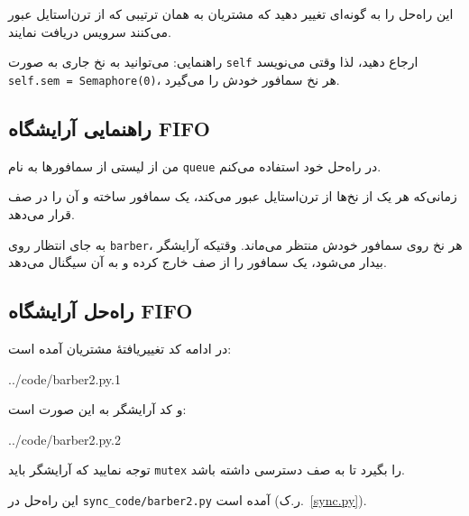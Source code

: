 \documentclass{book}
\newcommand{\clearemptydoublepage}{\newpage\cleardoublepage}
\begin{document}
	این راه‌حل را به گونه‌ای تغییر دهید که مشتریان به همان ترتیبی که از ترن‌استایل عبور می‌کنند سرویس دریافت نمایند.
  
	راهنمایی: می‌توانید به نخ جاری به صورت {\tt self} ارجاع دهید، 
	لذا وقتی می‌نویسد {\tt self.sem = Semaphore(0)}، هر نخ سمافور خودش را می‌گیرد.


\clearemptydoublepage
\subsection{راهنمایی آرایشگاه FIFO}

	من از لیستی از سمافورها به نام {\tt queue} در راه‌حل خود استفاده می‌کنم.

\begin{latin}

\end{latin}

	زمانی‌که هر یک از نخ‌ها از ترن‌استایل عبور می‌کند، یک سمافور ساخته و آن را در صف قرار می‌دهد.

	به جای انتظار روی {\tt barber}، هر نخ روی سمافور خودش منتظر می‌ماند. 
	وقتیکه آرایشگر بیدار می‌شود، یک سمافور را از صف خارج کرده و به آن سیگنال می‌دهد.


\clearemptydoublepage
\subsection{راه‌حل آرایشگاه FIFO}

	در ادامه کد تغییریافتهٔ مشتریان آمده است:

\begin{latin}

{../code/barber2.py.1}
\end{latin}

	و کد آرایشگر به این صورت است:

\begin{latin}

{../code/barber2.py.2}
\end{latin}

	توجه نمایید که آرایشگر باید {\tt mutex} را بگیرد تا به صف دسترسی داشته باشد.

	این راه‌حل در \verb"sync_code/barber2.py" آمده است (ر.ک.~\ref{sync.py}).

\clearemptydoublepage
\end{document}
